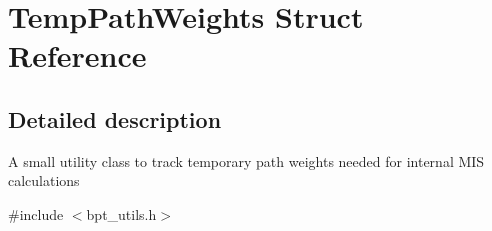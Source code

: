 \hypertarget{struct_temp_path_weights}{}\section{Temp\+Path\+Weights Struct Reference}
\label{struct_temp_path_weights}


\subsection{Detailed description}
\begin{DoxyParagraph}{}
A small utility class to track temporary path weights needed for internal M\+IS calculations 
\end{DoxyParagraph}


{\ttfamily \#include $<$bpt\+\_\+utils.\+h$>$}

